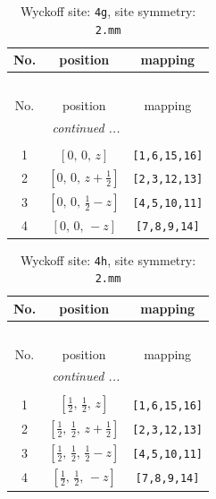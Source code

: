 \documentclass[fleqn,8pt]{jsarticle}
\begin{document}
\renewcommand{\arraystretch}{1.2}
\begin{longtable}{ccc}
\caption{Wyckoff site: {\tt 4g}, site symmetry: {\tt 2.mm}}
 \\
 \hline \hline
No. & position & mapping \\ \hline \endfirsthead

\multicolumn{2}{l}{\tablename\ \thetable{}} \\
 \hline \hline
No. & position & mapping \\ \hline \endhead

 \hline \hline
\multicolumn{2}{r}{\footnotesize\it continued ...} \\ \endfoot

 \hline \hline
\multicolumn{2}{r}{} \\ \endlastfoot

1 & $\left[ 0,\, 0,\, z \right]$ & {\tt [1,6,15,16]} \\ \hline
2 & $\left[ 0,\, 0,\, z + \frac{1}{2} \right]$ & {\tt [2,3,12,13]} \\ \hline
3 & $\left[ 0,\, 0,\, \frac{1}{2} - z \right]$ & {\tt [4,5,10,11]} \\ \hline
4 & $\left[ 0,\, 0,\, - z \right]$ & {\tt [7,8,9,14]} \\
\end{longtable}
\renewcommand{\arraystretch}{1.2}
\begin{longtable}{ccc}
\caption{Wyckoff site: {\tt 4h}, site symmetry: {\tt 2.mm}}
 \\
 \hline \hline
No. & position & mapping \\ \hline \endfirsthead

\multicolumn{2}{l}{\tablename\ \thetable{}} \\
 \hline \hline
No. & position & mapping \\ \hline \endhead

 \hline \hline
\multicolumn{2}{r}{\footnotesize\it continued ...} \\ \endfoot

 \hline \hline
\multicolumn{2}{r}{} \\ \endlastfoot

1 & $\left[ \frac{1}{2},\, \frac{1}{2},\, z \right]$ & {\tt [1,6,15,16]} \\ \hline
2 & $\left[ \frac{1}{2},\, \frac{1}{2},\, z + \frac{1}{2} \right]$ & {\tt [2,3,12,13]} \\ \hline
3 & $\left[ \frac{1}{2},\, \frac{1}{2},\, \frac{1}{2} - z \right]$ & {\tt [4,5,10,11]} \\ \hline
4 & $\left[ \frac{1}{2},\, \frac{1}{2},\, - z \right]$ & {\tt [7,8,9,14]} \\
\end{longtable}
\end{document}
